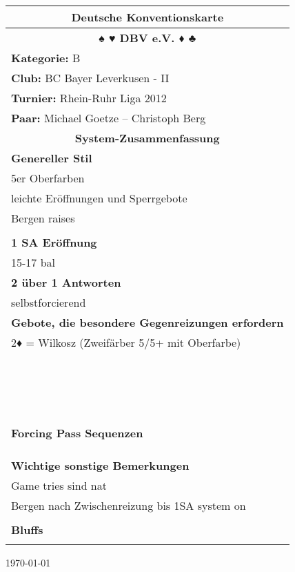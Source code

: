 \documentclass{article}
\begin{document}
\begin{multicols}{3}
\begin{tabularx}{\columnwidth}{|X|}
\hline \multicolumn{1}{c}{\bf \Large Deutsche Konventionskarte} \\
\hline \multicolumn{1}{c}{\bf \Large ♠ ♥ DBV e.V. ♦ ♣} \\
\hline {\bf Kategorie:} B \\
\hline {\bf Club:} BC Bayer Leverkusen - II \\
\hline {\bf Turnier:} Rhein-Ruhr Liga 2012 \\
\hline {\bf Paar:} Michael Goetze -- Christoph Berg \\

\hline \multicolumn{1}{c}{\bf \Large System-Zusammenfassung} \\
\hline {\bf Genereller Stil} \\
\hline 5er Oberfarben \\
 leichte Eröffnungen und Sperrgebote \\
 Bergen raises \\
 \\
\hline {\bf 1 SA Eröffnung} \\
\hline 15-17 bal \\
\hline {\bf 2 über 1 Antworten} \\
\hline selbstforcierend \\
\hline {\bf Gebote, die besondere Gegenreizungen erfordern} \\
\hline 2♦ = Wilkosz (Zweifärber 5/5+ mit Oberfarbe) \\
 \\
 \\
 \\
 \\
 \\
 \\
 \\
 \\
 \\
 \\
 \\
 \\
 \\
 \\
 \\
 \\
 \\
\hline {\bf Forcing Pass Sequenzen} \\
\hline \\
 \\
 \\
\hline {\bf Wichtige sonstige Bemerkungen} \\
\hline Game tries sind nat \\
 Bergen nach Zwischenreizung bis 1SA system on \\
 \\
\hline {\bf Bluffs} \\
\hline \\
\hline \end{tabularx}
\begin{flushright}
{\scriptsize \today}
\end{flushright}

\end{multicols}
\end{document}
